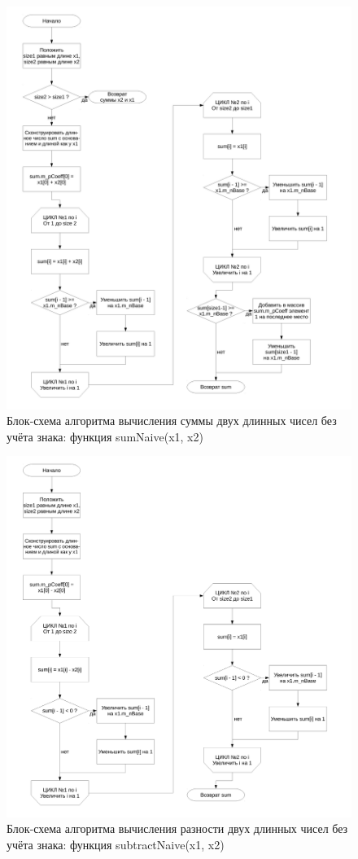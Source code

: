 \documentclass[a4paper,12pt]{article} %
\begin{document}
\begin{figure}[ht]
	\includegraphics[width=\textwidth]{lr1_sumNaive.pdf}
	\caption{Блок-схема алгоритма вычисления суммы двух длинных чисел без учёта знака: функция sumNaive(x1, x2)}
\end{figure}

\begin{figure}[ht]
	\includegraphics[width=\textwidth]{lr1_subtractNaive.pdf}
	\caption{Блок-схема алгоритма вычисления разности двух длинных чисел без учёта знака: функция subtractNaive(x1, x2)}
\end{figure}
\end{document}
